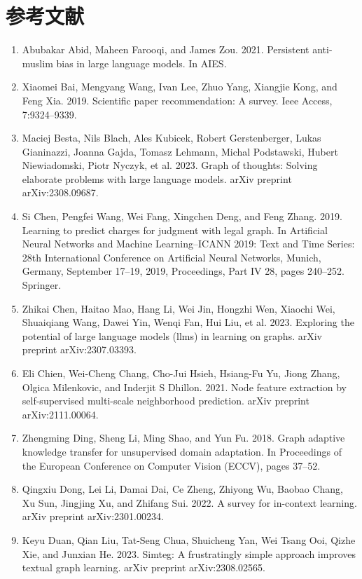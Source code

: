 \documentclass[11pt,UTF8,fontset=fandol]{ctexart}
\begin{document}
\section*{参考文献}
\begin{enumerate}[leftmargin=2em]
\item Abubakar Abid, Maheen Farooqi, and James Zou. 2021. Persistent anti-muslim bias in large language models. In AIES.
\item Xiaomei Bai, Mengyang Wang, Ivan Lee, Zhuo Yang, Xiangjie Kong, and Feng Xia. 2019. Scientific paper recommendation: A survey. Ieee Access, 7:9324--9339.
\item Maciej Besta, Nils Blach, Ales Kubicek, Robert Gerstenberger, Lukas Gianinazzi, Joanna Gajda, Tomasz Lehmann, Michal Podstawski, Hubert Niewiadomski, Piotr Nyczyk, et al. 2023. Graph of thoughts: Solving elaborate problems with large language models. arXiv preprint arXiv:2308.09687.
\item Si Chen, Pengfei Wang, Wei Fang, Xingchen Deng, and Feng Zhang. 2019. Learning to predict charges for judgment with legal graph. In Artificial Neural Networks and Machine Learning--ICANN 2019: Text and Time Series: 28th International Conference on Artificial Neural Networks, Munich, Germany, September 17--19, 2019, Proceedings, Part IV 28, pages 240--252. Springer.
\item Zhikai Chen, Haitao Mao, Hang Li, Wei Jin, Hongzhi Wen, Xiaochi Wei, Shuaiqiang Wang, Dawei Yin, Wenqi Fan, Hui Liu, et al. 2023. Exploring the potential of large language models (llms) in learning on graphs. arXiv preprint arXiv:2307.03393.
\item Eli Chien, Wei-Cheng Chang, Cho-Jui Hsieh, Hsiang-Fu Yu, Jiong Zhang, Olgica Milenkovic, and Inderjit S Dhillon. 2021. Node feature extraction by self-supervised multi-scale neighborhood prediction. arXiv preprint arXiv:2111.00064.
\item Zhengming Ding, Sheng Li, Ming Shao, and Yun Fu. 2018. Graph adaptive knowledge transfer for unsupervised domain adaptation. In Proceedings of the European Conference on Computer Vision (ECCV), pages 37--52.
\item Qingxiu Dong, Lei Li, Damai Dai, Ce Zheng, Zhiyong Wu, Baobao Chang, Xu Sun, Jingjing Xu, and Zhifang Sui. 2022. A survey for in-context learning. arXiv preprint arXiv:2301.00234.
\item Keyu Duan, Qian Liu, Tat-Seng Chua, Shuicheng Yan, Wei Tsang Ooi, Qizhe Xie, and Junxian He. 2023. Simteg: A frustratingly simple approach improves textual graph learning. arXiv preprint arXiv:2308.02565.

\end{enumerate}
\end{document}
